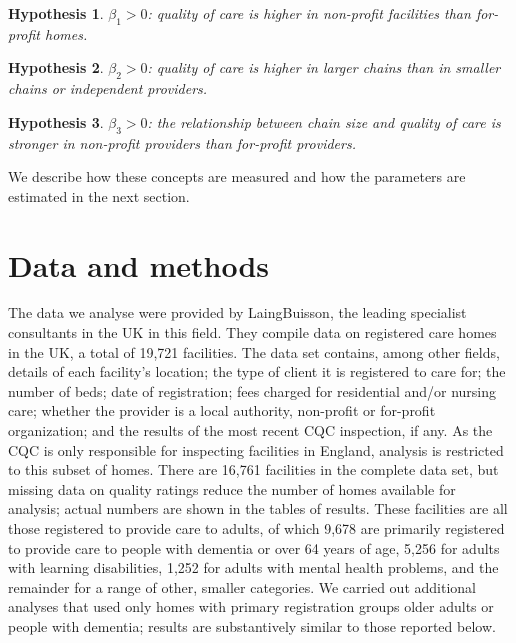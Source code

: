 \documentclass[a4paper,11pt,titlepage,british]{article}
\newtheorem{hypothesis}{Hypothesis}
\begin{document}
\begin{hypothesis}
  $\beta_1 > 0$: quality of care is higher in non-profit facilities than for-profit homes.
\end{hypothesis}

\begin{hypothesis}
  $\beta_2 > 0$: quality of care is higher in larger chains than in smaller chains or independent providers.
\end{hypothesis}

\begin{hypothesis}
  $\beta_3 > 0$: the relationship between chain size and quality of care is stronger in non-profit providers than for-profit providers.
\end{hypothesis}

\noindent We describe how these concepts are measured and how the parameters are estimated in the next section.

\section{Data and methods}

The data we analyse were provided by LaingBuisson, the leading specialist consultants in the UK in this field. They compile data on registered care homes in the UK, a total of 19,721 facilities.  The data set contains, among other fields, details of each facility’s location; the type of client it is registered to care for; the number of beds; date of registration; fees charged for residential and/or nursing care; whether the provider is a local authority, non-profit or for-profit organization; and the results of the most recent CQC inspection, if any.  As the CQC is only responsible for inspecting facilities in England, analysis is restricted to this subset of homes.  There are 16,761 facilities in the complete data set, but missing data on quality ratings reduce the number of homes available for analysis; actual numbers are shown in the tables of results.  These facilities are all those registered to provide care to adults, of which 9,678 are primarily registered to provide care to people with dementia or over 64 years of age, 5,256 for adults with learning disabilities, 1,252 for adults with mental health problems, and the remainder for a range of other, smaller categories.  We carried out additional analyses that used only homes with primary registration groups older adults or people with dementia; results are substantively similar to those reported below.
\end{document}
